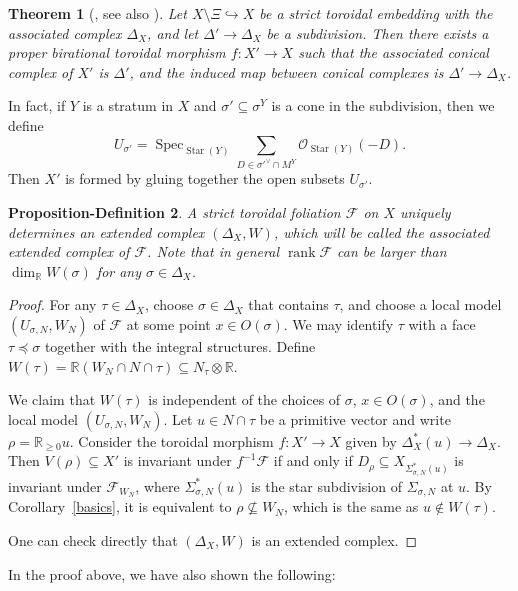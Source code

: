 \documentclass[12pt,reqno]{amsart}
\newtheorem{theorem}{Theorem}[section]
\newtheorem{propdef}[theorem]{Proposition-Definition}
\theoremstyle{definition}
\newcommand{\on}{\operatorname}
\newcommand\cF{{\mathcal{F}}}
\newcommand\cO{{\mathcal{O}}}
\newcommand\bR{{\mathbb R}}
\begin{document}
\begin{theorem}[{\cite[section 1.4]{AK00}, see also \cite[Theorem 6]{KKMS1973toroidal}}]\label{thm:toroidal_subdivision}
    Let $X\setminus\Xi\hookrightarrow X$ be a strict toroidal embedding with the associated complex $\Delta_X$, and let $\Delta'\to \Delta_X$ be a subdivision. Then there exists a proper birational toroidal morphism $f\colon X'\to X$ such that the associated conical complex of $X'$ is $\Delta'$, and the induced map between conical complexes is $\Delta'\to \Delta_X$. 
\end{theorem}

In fact, if $Y$ is a stratum in $X$ and $\sigma'\subseteq\sigma^Y$ is a cone in the subdivision, then we define 
\[U_{\sigma'} = \on{Spec}_{\on{Star}(Y)}\sum_{D\in\sigma'^\vee\cap M^Y}\cO_{\on{Star}(Y)}(-D).\]
Then $X'$ is formed by gluing together the open subsets $U_{\sigma'}$. 


\begin{propdef}\label{propdef:exist_extended_complex}
    A strict toroidal foliation $\cF$ on $X$ uniquely determines an extended complex $(\Delta_X,W)$, which will be called the \emph{associated extended complex} of $\cF$. Note that in general $\on{rank}\cF$ can be larger than $\dim_{\bR} W(\sigma)$ for any $\sigma\in\Delta_X$.
\end{propdef}
\begin{proof}
For any $\tau\in \Delta_X$, choose $\sigma\in\Delta_X$ that contains $\tau$, and choose a local model $(U_{\sigma,N},W_N)$ of $\cF$ at some point $x\in O(\sigma)$. We may identify $\tau$ with a face $\tau\preceq\sigma$ together with the integral structures. Define $W(\tau)=\bR(W_N \cap N \cap \tau)\subseteq N_\tau\otimes\bR$.

We claim that $W(\tau)$ is independent of the choices of $\sigma$, $x\in O(\sigma)$, and the local model $(U_{\sigma,N},W_N)$. Let $u\in N \cap \tau$ be a primitive vector and write $\rho=\bR_{\geq 0}u$. Consider the toroidal morphism $f\colon X'\to X$ given by $\Delta_X^*(u)\to \Delta_X$. Then $V(\rho)\subseteq X'$ is invariant under $f^{-1}\cF$ if and only if $D_{\rho}\subseteq X_{\Sigma_{\sigma,N}^*(u)}$ is invariant under $\cF_{W_N}$, where $\Sigma_{\sigma,N}^*(u)$ is the star subdivision of $\Sigma_{\sigma,N}$ at $u$. By Corollary~\ref{basics}, it is equivalent to $\rho\nsubseteq W_N$, which is the same as $u\notin W(\tau)$.

One can check directly that $(\Delta_X,W)$ is an extended complex.
\end{proof}
In the proof above, we have also shown the following:
\end{document}
